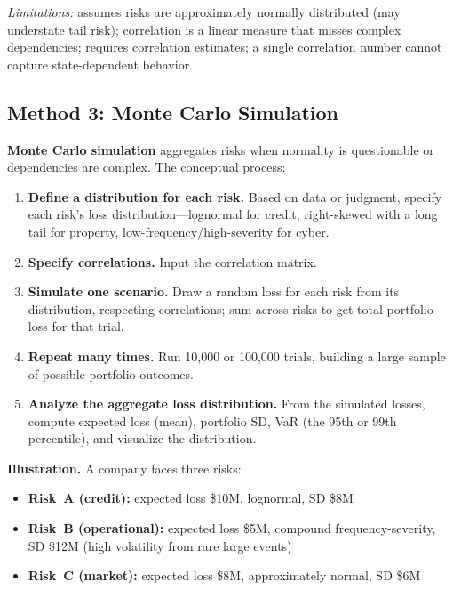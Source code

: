 \documentclass[11pt,openany]{book}
\providecommand{\tightlist}{\setlength{\itemsep}{0pt}\setlength{\parskip}{0pt}}
\begin{document}
\emph{Limitations:} assumes risks are approximately normally distributed (may
understate tail risk); correlation is a linear measure that misses complex
dependencies; requires correlation estimates; a single correlation number
cannot capture state-dependent behavior.

\subsection{Method 3: Monte Carlo Simulation}
\label{subsec:monte-carlo}

\textbf{Monte Carlo simulation} aggregates risks when normality is
questionable or dependencies are complex. The conceptual process:

\begin{enumerate}\tightlist
  \item \textbf{Define a distribution for each risk.} Based on data or
        judgment, specify each risk's loss distribution---lognormal for
        credit, right-skewed with a long tail for property,
        low-frequency/high-severity for cyber.
  \item \textbf{Specify correlations.} Input the correlation matrix.
  \item \textbf{Simulate one scenario.} Draw a random loss for each risk from
        its distribution, respecting correlations; sum across risks to get
        total portfolio loss for that trial.
  \item \textbf{Repeat many times.} Run 10{,}000 or 100{,}000 trials, building
        a large sample of possible portfolio outcomes.
  \item \textbf{Analyze the aggregate loss distribution.} From the simulated
        losses, compute expected loss (mean), portfolio SD, VaR (the 95th or
        99th percentile), and visualize the distribution.
\end{enumerate}

\textbf{Illustration.} A company faces three risks:
\begin{itemize}\tightlist
  \item \textbf{Risk~A (credit):} expected loss \$10M, lognormal, SD \$8M
  \item \textbf{Risk~B (operational):} expected loss \$5M, compound
        frequency-severity, SD \$12M (high volatility from rare large events)
  \item \textbf{Risk~C (market):} expected loss \$8M, approximately normal,
        SD \$6M
\end{itemize}
\end{document}
